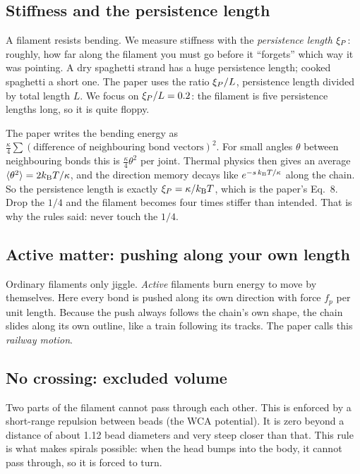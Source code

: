 \documentclass[11pt]{article}
\begin{document}
\subsection{Stiffness and the persistence length}
A filament resists bending. We measure stiffness with the \emph{persistence length} $\xi_{P}$: roughly, how far along the filament you must go before it ``forgets'' which way it was pointing.
A dry spaghetti strand has a huge persistence length; cooked spaghetti a short one. The paper uses the ratio $\xi_{P}/L$, persistence length divided by total length $L$.
We focus on $\xi_{P}/L=0.2$: the filament is five persistence lengths long, so it is quite floppy.

\begin{keybox}[title=Why the factor $1/4$ in the bending energy matters]
The paper writes the bending energy as $\frac{\kappa}{4}\sum(\text{difference of neighbouring bond vectors})^2$. For small angles $\theta$ between neighbouring bonds this is
$\frac{\kappa}{4}\theta^2$ per joint. Thermal physics then gives an average $\langle\theta^2\rangle=2k_{\mathrm{B}}T/\kappa$, and the direction memory decays like $e^{-s\,k_{\mathrm{B}}T/\kappa}$ along the chain.
So the persistence length is exactly $\xi_{P}=\kappa/k_{\mathrm{B}}T$, which is the paper's Eq.~8. Drop the $1/4$ and the filament becomes four times stiffer than intended.
That is why the rules said: never touch the $1/4$.
\end{keybox}

\subsection{Active matter: pushing along your own length}
Ordinary filaments only jiggle. \emph{Active} filaments burn energy to move by themselves. Here every bond is pushed along its own direction with force $f_p$ per unit length.
Because the push always follows the chain's own shape, the chain slides along its own outline, like a train following its tracks. The paper calls this \emph{railway motion}.

\subsection{No crossing: excluded volume}
Two parts of the filament cannot pass through each other. This is enforced by a short-range repulsion between beads (the WCA potential). It is zero beyond a distance of about 1.12 bead diameters and very steep closer than that.
This rule is what makes spirals possible: when the head bumps into the body, it cannot pass through, so it is forced to turn.
\end{document}
